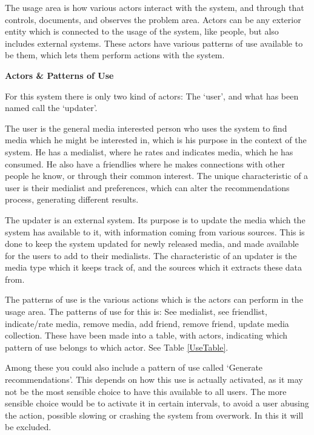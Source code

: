 The usage area is how various actors interact with the system, and through that controls, documents, and observes the problem area. Actors can be any exterior entity which is connected to the usage of the system, like people, but also includes external systems. These actors have various patterns of use available to be them, which lets them perform actions with the system.

\textbf{Actors \& Patterns of Use}

For this system there is only two kind of actors: The ‘user’, and what has been named call the ‘updater’.

The user is the general media interested person who uses the system to find media which he might be interested in, which is his purpose in the context of the system. He has a medialist, where he rates and indicates media, which he has consumed. He also have a friendlies where he makes connections with other people he know, or through their common interest. The unique characteristic of a user is their medialist and preferences, which can alter the recommendations process, generating different results.

The updater is an external system. Its purpose is to update the media which the system has available to it, with information coming from various sources. This is done to keep the system updated for newly released media, and made available for the users to add to their medialists. The characteristic of an updater is the media type which it keeps track of, and the sources which it extracts these data from.

The patterns of use is the various actions which is the actors can perform in the usage area. The patterns of use for this is: See medialist, see friendlist, indicate/rate media, remove media, add friend, remove friend, update media collection. These have been made into a table, with actors, indicating which pattern of use belongs to which actor. See Table \ref{UseTable}.

Among these you could also include a pattern of use called ‘Generate recommendations’. This depends on how this use is actually activated, as it may not be the most sensible choice to have this available to all users. The more sensible choice would be to activate it in certain intervals, to avoid a user abusing the action, possible slowing or crashing the system from overwork. In this it will be excluded.

